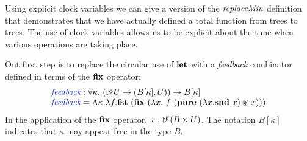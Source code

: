 Using explicit clock variables we can give a version of the
$\textit{replaceMin}$ definition that demonstrates that we have
actually defined a total function from trees to trees. The use of
clock variables allows us to be explicit about the time when various
operations are taking place.

Out first step is to replace the circular use of $\textbf{let}$ with a
\emph{feedback} combinator defined in terms of the $\textbf{fix}$
operator:
\begin{displaymath}
  \begin{array}{l}
    \defn{feedback} : \forall \kappa.~(\delay\kappa U \to (B[\kappa], U)) \to B[\kappa] \\
    \defn{feedback} = \Lambda \kappa. \lambda f. \kw{fst}~(\kw{fix}~(\lambda x.~f~(\kw{pure}~(\lambda x. \kw{snd}~x) \circledast x)))
  \end{array}
\end{displaymath}
In the application of the $\textbf{fix}$ operator, $x : \mathord{\rhd\kern-0.4em^{\kappa}} (B
\times U)$.  The notation $B[\kappa]$ indicates that $\kappa$ may
appear free in the type $B$.


\newcommand{\hlchangem}[1]{\colorbox{greybg}{$#1$}}
\newcommand{\hlchange}[1]{\colorbox{greybg}{#1}}

